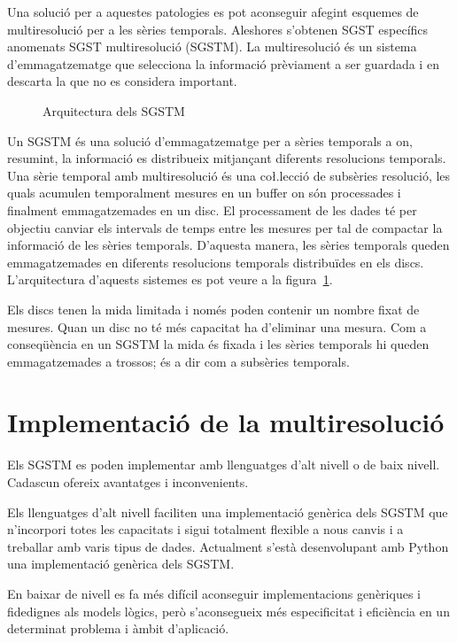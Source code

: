 Una solució per a aquestes patologies es pot aconseguir afegint
esquemes de multiresolució per a les sèries temporals. Aleshores
s'obtenen SGST específics anomenats SGST multiresolució (SGSTM).  La
multiresolució és un sistema d'emmagatzematge que selecciona la
informació prèviament a ser guardada i en descarta la que no es
considera important.


\begin{figure}[tp]
\centering

\caption{Arquitectura dels SGSTM}
\label{fig:vhdl:bdstm}
\end{figure}


Un SGSTM és una solució d'emmagatzematge per a sèries temporals a on,
resumint, la informació es distribueix mitjançant diferents
resolucions temporals.  Una sèrie temporal amb multiresolució és una
co\l.lecció de subsèries resolució, les quals acumulen temporalment
mesures en un buffer on són processades i finalment emmagatzemades
en un disc. El processament de les dades té per objectiu canviar els
intervals de temps entre les mesures per tal de compactar la
informació de les sèries temporals. D'aquesta manera, les sèries
temporals queden emmagatzemades en diferents resolucions temporals
distribuïdes en els discs.  L'arquitectura d'aquests sistemes es pot
veure a la figura~\ref{fig:vhdl:bdstm}.

Els discs tenen la mida limitada i només poden contenir un nombre
fixat de mesures. Quan un disc no té més capacitat ha d'eliminar una
mesura. Com a conseqüència en un SGSTM la mida és fixada i les sèries
temporals hi queden emmagatzemades a trossos; és a dir com a subsèries
temporals.



\section{Implementació de la multiresolució}

Els SGSTM es poden implementar amb llenguatges d'alt nivell o de baix
nivell. Cadascun ofereix avantatges i inconvenients.

Els llenguatges d'alt nivell faciliten una implementació genèrica dels
SGSTM que n'incorpori totes les capacitats i sigui totalment flexible
a nous canvis i a treballar amb varis tipus de dades. Actualment
s'està desenvolupant amb Python una implementació genèrica dels SGSTM.


En baixar de nivell es fa més difícil aconseguir implementacions
genèriques i fidedignes als models lògics, però s'aconsegueix més
especificitat i eficiència en un determinat problema i àmbit d'aplicació.

